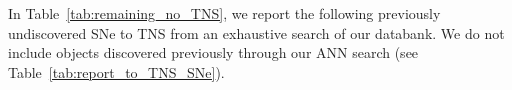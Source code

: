 \documentclass[twocolumn]{aastex63}
\begin{document}
In Table~\ref{tab:remaining_no_TNS}, we report the following previously undiscovered SNe to TNS from an exhaustive search of our databank. We do not include objects discovered previously through our ANN search (see Table~\ref{tab:report_to_TNS_SNe}). 

\newpage




\hspace*{-10mm}
\begin{minipage}{\textwidth}
\footnotesize
\centering {}
\vspace*{-1mm}
\label{tab:report_to_TNS_SNe}
\begin{tabular}{cccccc}


\end{tabular}
\end{minipage}
\end{document}

